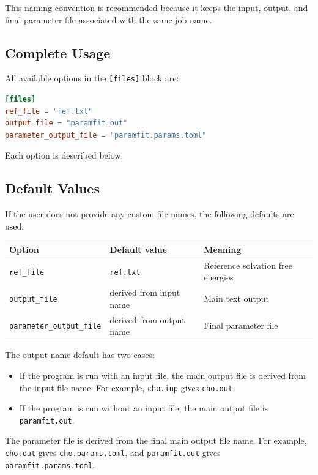 \documentclass[11pt]{article}
\begin{document}
This naming convention is recommended because it keeps the input, output, and
final parameter file associated with the same job name.

\subsection{Complete Usage}

All available options in the \texttt{[files]} block are:

\begin{lstlisting}[language=toml]
[files]
ref_file = "ref.txt"
output_file = "paramfit.out"
parameter_output_file = "paramfit.params.toml"
\end{lstlisting}

Each option is described below.

\subsection{Default Values}

If the user does not provide any custom file names, the following defaults are
used:

\begin{center}
\begin{tabular}{lll}
\toprule
Option & Default value & Meaning \\
\midrule
\texttt{ref\_file} & \texttt{ref.txt} & Reference solvation free energies \\
\texttt{output\_file} & derived from input name & Main text output \\
\texttt{parameter\_output\_file} & derived from output name & Final parameter file \\
\bottomrule
\end{tabular}
\end{center}

The output-name default has two cases:

\begin{itemize}[leftmargin=*]
  \item If the program is run with an input file, the main output file is derived
        from the input file name. For example, \texttt{cho.inp} gives
        \texttt{cho.out}.
  \item If the program is run without an input file, the main output file is
        \texttt{paramfit.out}.
\end{itemize}

The parameter file is derived from the final main output file name. For example,
\texttt{cho.out} gives \texttt{cho.params.toml}, and \texttt{paramfit.out} gives
\texttt{paramfit.params.toml}.
\end{document}
